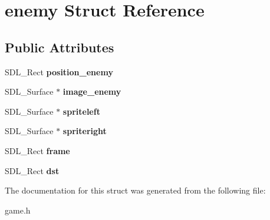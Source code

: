 \hypertarget{structenemy}{}\section{enemy Struct Reference}
\label{structenemy}
\subsection*{Public Attributes}
\begin{DoxyCompactItemize}
\item 
\mbox{\label{structenemy_a70662a0b9becc1763ef18f022b668696}} 
S\+D\+L\+\_\+\+Rect {\bfseries position\+\_\+enemy}
\item 
\mbox{\label{structenemy_a39fbc07cd1f9630e235fdd1b0912aeaa}} 
S\+D\+L\+\_\+\+Surface $\ast$ {\bfseries image\+\_\+enemy}
\item 
\mbox{\label{structenemy_a1e2ecac115b5866591fa1ca55add0acd}} 
S\+D\+L\+\_\+\+Surface $\ast$ {\bfseries spriteleft}
\item 
\mbox{\label{structenemy_ae0183c5cb39be7491ca3f3bf8e4d5809}} 
S\+D\+L\+\_\+\+Surface $\ast$ {\bfseries spriteright}
\item 
\mbox{\label{structenemy_ac3ee52a32a02b01b845c55e2d9204ba8}} 
S\+D\+L\+\_\+\+Rect {\bfseries frame}
\item 
\mbox{\label{structenemy_a60574669ddf5dc3916972ce4a1b7b8f0}} 
S\+D\+L\+\_\+\+Rect {\bfseries dst}
\end{DoxyCompactItemize}


The documentation for this struct was generated from the following file\+:\begin{DoxyCompactItemize}
\item 
game.\+h\end{DoxyCompactItemize}
